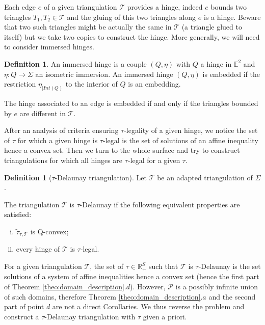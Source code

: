 \documentclass[a4paper,12pt]{article}
\def\TT{\mathcal T}
\def\E{\mathbf E}
\def\adm{\P}
\def\E{\mathbb{E}}
\def\RR{\mathbb{R}}
\def\E{\mathbb{E}}
\def\adm{\mathcal{P}}
\def\P{\mathcal{P}}
\newcommand{\tautilde}[2]{\widetilde\tau_{#1,#2}}
\theoremstyle{definition}
\newtheorem{defi}[lem]{Definition}	%
\begin{document}
					Each edge $e$ of a given triangulation $\TT$ provides a hinge, indeed $e$ bounds two triangles $T_1,T_2\in \TT$ and the gluing of this two triangles along $e$ is a hinge. Beware that two such triangles might be actually the same in $\TT$ (a triangle glued to itself) but we take two copies to construct the hinge. More generally, we will need to consider immersed hinges.
					\begin{defi}\label{defi:immersed_hinge} An immersed hinge is a couple $(Q,\eta)$ with $Q$ a hinge  in $\E^2$ and $\eta: Q \rightarrow \Sigma$ an isometric
						immersion.		
						An immersed hinge $(Q,\eta)$ is embedded if the restriction  $\eta_{|Int(Q)}$ to the interior of $Q$ is an embedding.
					\end{defi}
					The hinge associated to an edge is embedded if and only if the triangles bounded by $e$ are different in $\TT$. 
					
					After an analysis of criteria ensuring $\tau$-legality of a given hinge, we notice the set of $\tau$ for which a given hinge is $\tau$-legal is the set of solutions of an affine inequality hence a convex set. Then we turn to the whole surface and try to construct triangulations for which all hinges are $\tau$-legal for a given $\tau$. 
					
					\begin{defi}[$\tau$-Delaunay triangulation]\label{def:delaunay_triangulation}
						Let $\TT$ be an adapted triangulation of $\Sigma$.

						The triangulation $\TT$ is $\tau$-Delaunay if the following equivalent properties are satisfied:
						\begin{enumerate}[(i)]
							\item $\tautilde{\tau}{\TT}$ is Q-convex;
							\item every hinge of $\TT$ is $\tau$-legal.
						\end{enumerate}
					\end{defi}
					For a given triangulation $\TT$, the set of $\tau\in\RR_ +^S$ such that $\TT$ is $\tau$-Delaunay is the set solutions of a system of affine inequalities hence a convex set (hence the first part of Theorem \ref{theo:domain_description}.$d$). However, $\adm$ is a possibly infinite union of such domains, therefore Theorem \ref{theo:domain_description}.$a$ and the second part of  point $d$ are not a direct Corollaries. We thus reverse the problem and construct a $\tau$-Delaunay triangulation with $\tau$ given a priori.
					
\end{document}
